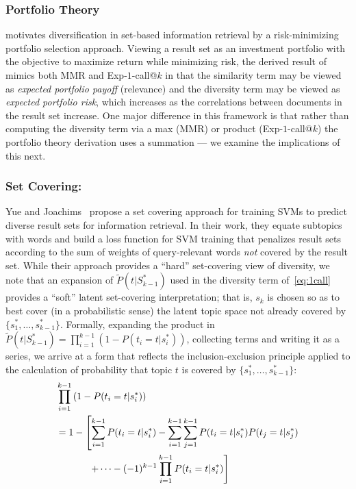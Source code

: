 \subsubsection{Portfolio Theory}
\cite{wang09PortfolioTheory} motivates
diversification in set-based information retrieval by a
risk-minimizing portfolio selection approach.  Viewing a result set as
an investment portfolio with the objective to maximize return while
minimizing risk, the derived result of~\cite{wang09PortfolioTheory}
mimics both MMR and Exp-$1$-call@$k$ in that the similarity term may
be viewed as \emph{expected portfolio payoff} (relevance) and the
diversity term may be viewed as \emph{expected portfolio risk}, which
increases as the correlations between documents in the result set
increase.  One major difference in this framework is that rather than
computing the diversity term via a max (MMR) or product
(Exp-$1$-call@$k$) the portfolio theory derivation uses a summation
--- we examine the implications of this next.

\subsubsection{Set Covering:}
Yue and Joachims~\cite{yue081224Predicting} propose a set covering
approach for training SVMs to predict diverse result sets for
information retrieval.  In their work, they equate subtopics with
words and build a loss function for SVM training that penalizes
result sets according to the sum of weights of query-relevant words
\emph{not} covered by the result set.  While their approach provides a
``hard'' set-covering view of diversity, we note that an expansion of
$\tilde{P}(t | S_{k-1}^*)$ used in the diversity term
of~\eqref{eq:1call} provides a ``soft'' latent set-covering
interpretation; that is, $s_k$ is chosen so as to best cover (in a
probabilistic sense) the latent topic space not already covered by $\{
s_1^*,\ldots,s_{k-1}^* \}$.  Formally, expanding the product in
$\tilde{P}(t | S_{k-1}^*) = \prod_{i=1}^{k-1} \left(1 -
P(t_{i}=t|s_{i}^{*})\right)$, collecting terms and writing it as a
series, we arrive at a form that reflects the inclusion-exclusion
principle applied to the calculation of probability that topic $t$ is
covered by $\{ s_1^*,\ldots,s_{k-1}^* \}$:
\begin{align}
& \prod_{i=1}^{k-1} \left(1 - P(t_{i}=t|s_{i}^{*})\right) \nonumber \\
& = 1 - \left[ \sum_{i=1}^{k-1} P(t_{i}= t|s_{i}^{*}) - \sum_{i=1}^{k-1}\sum_{j=1}^{k-1}P(t_{i}= t|s_{i}^{*})P(t_{j}= t|s_{j}^{*}) \right. \nonumber \\
& \hspace{12mm} \left. + \dots - (-1)^{k-1}\prod_{i=1}^{k-1}P(t_{i}=t|s_{i}^{*})\right] \label{eq:setcover}
\end{align}

